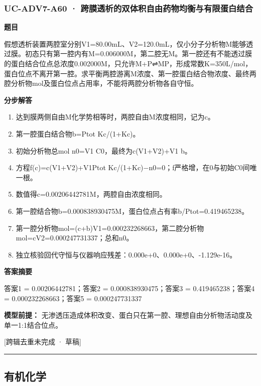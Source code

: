 \documentclass[UTF8,11pt,a4paper]{ctexart}
\begin{document}
\subsubsection*{UC-ADV7-A60 · 跨膜透析的双体积自由药物均衡与有限蛋白结合}
\noindent\textbf{题目}\par
假想透析装置两腔室分别V1=80.00mL、V2=120.0mL，仅小分子分析物M能够透过膜。初态只有第一腔内有M=0.006000M，第二腔无M。第一腔还有不能透过膜的蛋白结合位点总浓度0.002000M，只允许M+P⇌MP，形成常数K=350L/mol，蛋白位点不离开第一腔。求平衡两腔游离M浓度、第一腔蛋白结合物浓度、最终两腔分析物mol及蛋白位点占用率，不能将两腔分析物各自守恒。\par
\medskip\noindent\textbf{分步解答}
\begin{enumerate}
\item 达到膜两侧自由M化学势相等时，两腔自由M浓度相同，记为c。
\item 第一腔蛋白结合物b=Ptot Kc/(1+Kc)。
\item 初始分析物总mol n0=V1 C0，最终为c(V1+V2)+V1 b。
\item 方程f(c)=c(V1+V2)+V1Ptot Kc/(1+Kc)−n0=0；f严格增，在0与初始C0间唯一根。
\item 数值得c=0.00206442781M，两腔自由浓度相同。
\item 第一腔结合物b=0.000838930475M，蛋白位点占有率b/Ptot=0.419465238。
\item 第一腔分析物mol=(c+b)V1=0.000232268663，第二腔分析物mol=cV2=0.000247731337；总和n0。
\item 独立核验回代守恒与仪器响应残差：0.000e+0、0.000e+0、-1.129e-16。
\end{enumerate}
\noindent\textbf{答案摘要}\par
答案1 = 0.00206442781；答案2 = 0.000838930475；答案3 = 0.419465238；答案4 = 0.000232268663；答案5 = 0.000247731337\par
\noindent\textbf{模型前提：}
无渗透压造成体积改变、蛋白只在第一腔、理想自由分析物活动度及单一1:1结合位点。\par
\noindent\textcolor{red!65!black}{[跨辑去重未完成 · 草稿]} \par
\medskip\hrule\medskip
\subsection*{有机化学}
\end{document}
